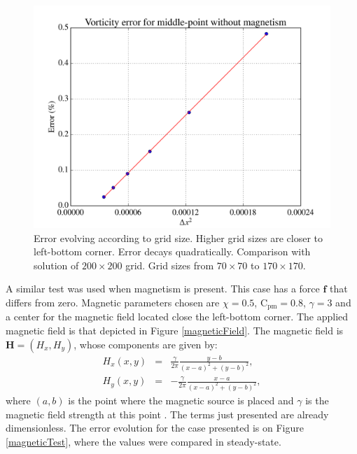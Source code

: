 \documentclass[journal]{IEEEtran}
\begin{document}
\begin{figure}[!t]
\centering
\includegraphics[width=\linewidth]{figures/validateHydrodynamicsRe40}
\caption{Error evolving according to grid size. Higher grid sizes are closer to left-bottom corner. Error decays quadratically. Comparison with solution of $200\times 200$ grid. Grid sizes from $70\times 70$ to $170\times 170$. \label{hydrodynamicsTest}}
\end{figure}

A similar test was used when magnetism is present. This case has a force $\mathbf{f}$ that differs from zero. Magnetic parameters chosen are $\chi=0.5$, $\mathrm{C}_\mathrm{pm}=0.8$, $\gamma=3$ and a center for the magnetic field located close the left-bottom corner. The applied magnetic field is that depicted in Figure \ref{magneticField}. The magnetic field is $\mathbf{H}=(H_x,H_y)$, whose components are given by: \begin{eqnarray}
H_x(x,y) & = & \frac{\gamma}{2\pi} \frac{y - b}{(x-a)^2+(y-b)^2},\\
H_y(x,y) & = & -\frac{\gamma}{2\pi} \frac{x - a}{(x-a)^2+(y-b)^2},
\end{eqnarray} where $(a,b)$ is the point where the magnetic source is placed and $\gamma$ is the magnetic field strength at this point \cite{Tzirtzilakis2013}. The terms just presented are already dimensionless. The error evolution for the case presented is on Figure \ref{magneticTest}, where the values were compared in steady-state.
\end{document}
